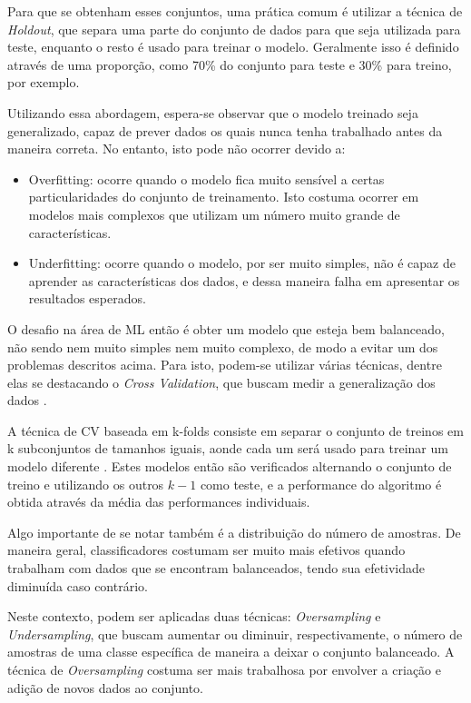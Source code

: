 Para que se obtenham esses conjuntos, uma prática comum é utilizar a técnica de \textit{Holdout}, que separa uma parte do conjunto de dados para que seja utilizada para teste, enquanto o resto é usado para treinar o modelo. Geralmente isso é definido através de uma proporção, como 70\% do conjunto para teste e 30\% para treino, por exemplo. \cite{van2010process}

Utilizando essa abordagem, espera-se observar que o modelo treinado seja generalizado, capaz de prever dados os quais nunca tenha trabalhado antes da maneira correta. No entanto, isto pode não ocorrer devido a:

\begin{itemize}
    \item Overfitting: ocorre quando o modelo fica muito sensível a certas particularidades do conjunto de treinamento. Isto costuma ocorrer em modelos mais complexos que utilizam um número muito grande de características.
    \item Underfitting: ocorre quando o modelo, por ser muito simples, não é capaz de aprender as características dos dados, e dessa maneira falha em apresentar os resultados esperados. 
\end{itemize}

O desafio na área de ML então é obter um modelo que esteja bem balanceado, não sendo nem muito simples nem muito complexo, de modo a evitar um dos problemas descritos acima. Para isto, podem-se utilizar várias técnicas, dentre elas se destacando o \textit{Cross Validation}, que buscam medir a generalização dos dados \cite{muller2017introduction}.

A técnica de CV baseada em k-folds consiste em separar o conjunto de treinos em k subconjuntos de tamanhos iguais, aonde cada um será usado para treinar um modelo diferente . Estes modelos então são verificados alternando o conjunto de treino e utilizando os outros $k-1$ como teste, e a performance do algoritmo é obtida através da média das performances individuais. 

Algo importante de se notar também é a distribuição do número de amostras. De maneira geral, classificadores costumam ser muito mais efetivos quando trabalham com dados que se encontram balanceados, tendo sua efetividade diminuída caso contrário. \cite{yap2014application}

Neste contexto, podem ser aplicadas duas técnicas: \textit{Oversampling} e \textit{Undersampling}, que buscam aumentar ou diminuir, respectivamente, o número de amostras de uma classe específica de maneira a deixar o conjunto balanceado. A técnica de \textit{Oversampling} costuma ser mais trabalhosa por envolver a criação e adição de novos dados ao conjunto. 

